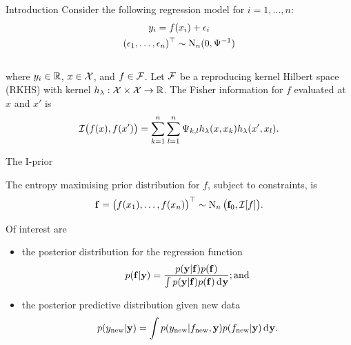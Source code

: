 \documentclass{beamer}
\newlength{\onecolwid}
\begin{document}
\begin{frame}[t]
\begin{columns}[t]
\begin{column}{\onecolwid}
\begin{block}{Introduction}
Consider the following regression model for $i=1,\dots,n$:
~\\[-20pt]
\begin{align}\label{eq:normalmodel}
  \begin{gathered}
      y_i = f(x_i) + \epsilon_i \\
    (\epsilon_1, \dots, \epsilon_n)^\top \sim \operatorname{N}_n(0,\Psi^{-1})
  \end{gathered}
\end{align}
~\\[-7pt]
where $y_i \in \mathbb{R}$, $x \in {\mathcal X}$, and $f \in {\mathcal F}$. Let ${\mathcal F}$ be a reproducing kernel Hilbert space (RKHS) with kernel $h_\lambda:{\mathcal X} \times {\mathcal X} \to \mathbb{R}$. The Fisher information for $f$ evaluated at $x$ and $x'$ is
~\\[-20pt]
\begin{align}
  {\mathcal I}\big(f(x), f(x')\big) = \sum_{k=1}^n \sum_{l=1}^n \Psi_{k,l} h_\lambda(x,x_k) h_\lambda(x',x_l).
\end{align}

\begin{alertblock}{The I-prior}

The entropy maximising prior distribution for $f$, subject to constraints, is 
\[
  {\mathbf f} = \big(f(x_1),\dots,f(x_n) \big)^\top \sim \operatorname{N}_n \big({\mathbf f}_0, {\mathcal I}[f] \big).
\]

\vspace{10pt}

\end{alertblock}

\vspace{-10pt}
Of interest are 

\newcommand{\new}{{\text{new}}}
\begin{itemize}
  \item the posterior distribution for the regression function
  \[
    p({\mathbf f}|{\mathbf y}) = \frac{p({\mathbf y}|{\mathbf f}) p({\mathbf f})}{\int p({\mathbf y}|{\mathbf f}) p({\mathbf f}) \operatorname{d\!\:\!} {\mathbf y}}; \text{and}
  \]
  \item the posterior predictive distribution given new data
  \[
    p(y_\new|\by) = \int p(y_\new|f_\new,\by) p(f_\new|\by) \d \by.
  \]
\end{itemize}

\end{block}




\end{column}
\end{columns}
\end{frame}
\end{document}
